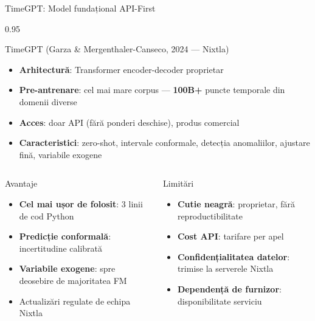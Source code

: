 \documentclass[9pt, aspectratio=169, t]{beamer}
\begin{document}
\begin{frame}{TimeGPT: Model fundațional API-First}
    \begin{cminipage}{0.95\textwidth}
    \vspace{-3mm}
    {\scriptsize
    \begin{block}{TimeGPT (Garza \& Mergenthaler-Canseco, 2024 --- Nixtla)}
        \vspace{-1mm}
        \begin{itemize}\setlength{\itemsep}{0pt}
            \item \textbf{Arhitectură}: Transformer encoder-decoder proprietar
            \item \textbf{Pre-antrenare}: cel mai mare corpus --- \textbf{100B+} puncte temporale din domenii diverse
            \item \textbf{Acces}: doar API (fără ponderi deschise), produs comercial
            \item \textbf{Caracteristici}: zero-shot, intervale conformale, detecția anomaliilor, ajustare fină, variabile exogene
        \end{itemize}
        \vspace{-1mm}
    \end{block}
    \vspace{-3mm}
    \begin{columns}[T]
        \begin{exampleblock}{Avantaje}
            \begin{itemize}\setlength{\itemsep}{0pt}
                \item \textbf{Cel mai ușor de folosit}: 3 linii de cod Python
                \item \textbf{Predicție conformală}: incertitudine calibrată
                \item \textbf{Variabile exogene}: spre deosebire de majoritatea FM
                \item Actualizări regulate de echipa Nixtla
            \end{itemize}
        \end{exampleblock}

        \begin{alertblock}{Limitări}
            \begin{itemize}\setlength{\itemsep}{0pt}
                \item \textbf{Cutie neagră}: proprietar, fără reproductibilitate
                \item \textbf{Cost API}: tarifare per apel
                \item \textbf{Confidențialitatea datelor}: trimise la serverele Nixtla
                \item \textbf{Dependență de furnizor}: disponibilitate serviciu
            \end{itemize}
        \end{alertblock}
    \end{columns}
    }
    \end{cminipage}
\end{frame}
\end{document}
